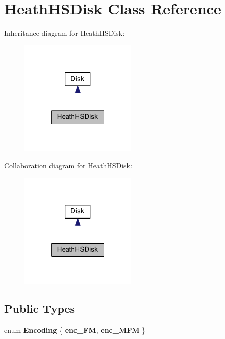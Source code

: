 \hypertarget{classHeathHSDisk}{}\section{Heath\+H\+S\+Disk Class Reference}
\label{classHeathHSDisk}


Inheritance diagram for Heath\+H\+S\+Disk\+:
\nopagebreak
\begin{figure}[H]
\begin{center}
\leavevmode
\includegraphics[width=157pt]{classHeathHSDisk__inherit__graph}
\end{center}
\end{figure}


Collaboration diagram for Heath\+H\+S\+Disk\+:
\nopagebreak
\begin{figure}[H]
\begin{center}
\leavevmode
\includegraphics[width=157pt]{classHeathHSDisk__coll__graph}
\end{center}
\end{figure}
\subsection*{Public Types}
\begin{DoxyCompactItemize}
\item 
\hypertarget{classDisk_a2eaa045357515c1586d007fb0698fce3}{}enum {\bfseries Encoding} \{ {\bfseries enc\+\_\+\+F\+M}, 
{\bfseries enc\+\_\+\+M\+F\+M}
 \}\label{classDisk_a2eaa045357515c1586d007fb0698fce3}

\end{DoxyCompactItemize}
